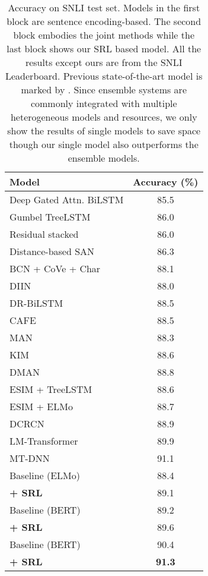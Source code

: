 \documentclass[11pt]{article}
\begin{document}
\begin{table}[H]
	\centering
	{
		\begin{tabular}{l c}
			\hline
			
			\hline
			Model  & Accuracy (\%) \\ 
			\hline
			Deep Gated Attn. BiLSTM 	 & 85.5 \\
			Gumbel TreeLSTM  	 & 86.0 \\
			Residual stacked  	 & 86.0 \\
			Distance-based SAN  	 	& 86.3 \\
			\hline
			BCN + CoVe + Char   	 & 88.1 \\
			DIIN 		 & 88.0 \\
			DR-BiLSTM   	 & 88.5 \\
			CAFE  	 	 & 88.5\\
			MAN  	 	 & 88.3\\
			KIM  	 	 & 88.6 \\
			DMAN    & 88.8 \\
			ESIM + TreeLSTM   	   & 88.6\\
			ESIM + ELMo   	 	 & 88.7 \\
			DCRCN    & 88.9 \\
			LM-Transformer   & 89.9 \\
			MT-DNN & 91.1\\
			\hline
			Baseline (ELMo)     &88.4 \\
			\textbf{+ SRL}   &  89.1 \\
			Baseline (BERT)    &89.2\\
			\textbf{+ SRL}   &  89.6 \\
			Baseline (BERT)      & 90.4 \\
			\textbf{+ SRL}    & \textbf{91.3} \\
			\hline
			
			\hline
		\end{tabular}
	}
	
	\caption{\label{tab:snli} Accuracy on SNLI test set. Models in the first block are sentence encoding-based. The second block embodies the joint methods while the last block shows our SRL based model. All the results except ours are from the SNLI Leaderboard. Previous state-of-the-art model is marked by . Since ensemble systems are commonly integrated with multiple heterogeneous models and resources, we only show the results of single models to save space though our single model also outperforms the ensemble models.}
\end{table}
\end{document}
